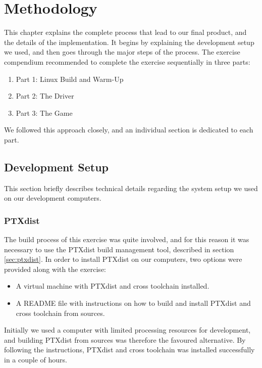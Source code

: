 \chapter{Methodology}
This chapter explains the complete process that lead to our final product, and the details of the implementation. It begins by explaining the development setup we used, and then goes through the major steps of the process. The exercise compendium recommended to complete the exercise sequentially in three parts:
\begin{enumerate}
  \item Part 1: Linux Build and Warm-Up
  \item Part 2: The Driver
  \item Part 3: The Game
\end{enumerate}
We followed this approach closely, and an individual section is dedicated to each part.


\section{Development Setup}
This section briefly describes technical details regarding the system setup we used on our development computers.

\subsection{PTXdist}
The build process of this exercise was quite involved, and for this reason it was necessary to use the PTXdist build management tool, described in section \ref{sec:ptxdist}. In order to install PTXdist on our computers, two options were provided along with the exercise:
\begin{itemize}
  \item A virtual machine with PTXdist and cross toolchain installed.
  \item A README file with instructions on how to build and install PTXdist and cross toolchain from sources.
\end{itemize}
Initially we used a computer with limited processing resources for development, and building PTXdist from sources was therefore the favoured alternative. By following the instructions, PTXdist and cross toolchain was installed successfully in a couple of hours.

